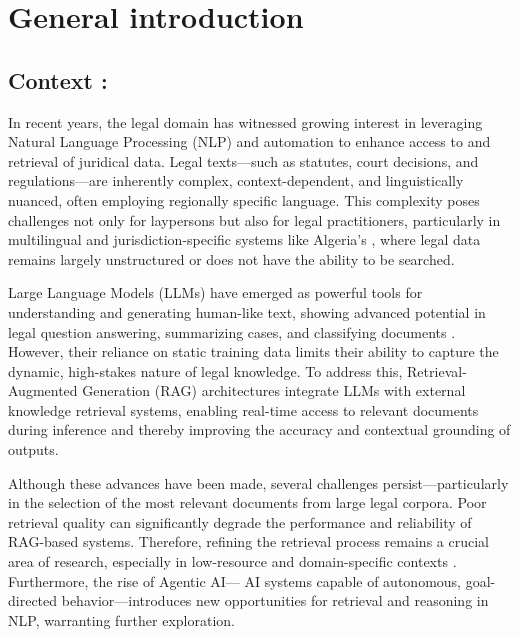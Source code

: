\chapter*{General introduction}
\pagestyle{fancy}
\pagestyle{fancy}\chead{} \pagestyle{fancy}\rhead{}
\pagestyle{fancy}\cfoot{} \pagestyle{fancy}\rfoot{\thepage}
\section*{Context :}
In recent years, the legal domain has witnessed growing interest in leveraging Natural Language Processing (NLP) and automation to enhance access to and retrieval of juridical data. Legal texts—such as statutes, court decisions, and regulations—are inherently complex, context-dependent, and linguistically nuanced, often employing regionally specific language. This complexity poses challenges not only for laypersons but also for legal practitioners, particularly in multilingual and jurisdiction-specific systems like Algeria’s \citep{HamoudaSidhoum2024}, where  legal data remains largely unstructured  or does not have the ability to be searched.

Large Language Models (LLMs) have emerged as powerful tools for understanding and generating human-like text, showing advanced potential in legal question answering, summarizing cases, and classifying documents \citep{Naveed2023}. However, their reliance on static training data limits their ability to capture the dynamic, high-stakes nature of legal knowledge. To address this, Retrieval-Augmented Generation (RAG) architectures integrate LLMs with external knowledge retrieval systems\citep{lewis2020retrieval}, enabling real-time access to relevant documents during inference and thereby improving the accuracy and contextual grounding of outputs.

Although these advances have been made, several challenges persist—particularly in the selection of the most relevant documents from large legal corpora. Poor retrieval quality can significantly degrade the performance and reliability of RAG-based systems. Therefore, refining the retrieval process remains a crucial area of research, especially in low-resource and domain-specific contexts \citep{Information_Retrieval}. Furthermore, the rise of Agentic AI— AI systems capable of autonomous, goal-directed behavior—introduces new opportunities for retrieval and reasoning in NLP\citep{aisera2024agentic}, warranting further exploration.
